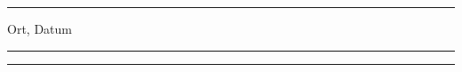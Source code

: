 \documentclass{report}
\begin{document}

\vspace{6em}

\hfill\parbox{4cm}{\hrule \strut \centering\footnotesize Ort, Datum}
\hfill\parbox{4cm}{\hrule \strut \centering\footnotesize \NameA}
\hfill\parbox{4cm}{\hrule \strut \centering\footnotesize \NameB}
\end{document}
